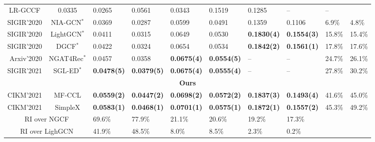 \documentclass[sigconf,authorversion]{acmart}
\begin{document}
\begin{table*}[!t]
\begin{tabular}{rcllllllll}
  \multicolumn{1}{c|}{LR-GCCF} &
  0.0335 &
  \multicolumn{1}{l|}{0.0265} &
  0.0561 &
  \multicolumn{1}{l|}{0.0343} &
  0.1519 &
  \multicolumn{1}{l|}{0.1285} &
  -- &
 -- \\
\multicolumn{1}{r|}{SIGIR'2020} &
  \multicolumn{1}{c|}{NIA-GCN$^\ast$} &
  0.0369 &
  \multicolumn{1}{l|}{0.0287} &
  0.0599 &
  \multicolumn{1}{l|}{0.0491} &
  0.1359 &
  \multicolumn{1}{l|}{0.1106} &
  6.9\% &
  4.8\% \\
\multicolumn{1}{r|}{SIGIR'2020} &
  \multicolumn{1}{c|}{LightGCN$^\ast$} &
  0.0411 &
  \multicolumn{1}{l|}{0.0315} &
  0.0649 &
  \multicolumn{1}{l|}{0.0530} &
  \textbf{0.1830(4)} &
  \multicolumn{1}{l|}{\textbf{0.1554(3)}} &
  15.8\% &
  15.4\% \\
\multicolumn{1}{r|}{SIGIR'2020} &
  \multicolumn{1}{c|}{DGCF$^\ast$} &
  0.0422 &
  \multicolumn{1}{l|}{0.0324} &
  0.0654 &
  \multicolumn{1}{l|}{0.0534} &
  \textbf{0.1842(2)} &
  \multicolumn{1}{l|}{\textbf{0.1561(1)}} &
  17.8\% &
  17.6\% \\
\multicolumn{1}{r|}{Arxiv'2020} &
  \multicolumn{1}{c|}{NGAT4Rec$^\ast$} &
  0.0457 &
  \multicolumn{1}{l|}{0.0358} &
  \textbf{0.0675(4)} &
  \multicolumn{1}{l|}{\textbf{0.0554(5)}} &
  -- &
  \multicolumn{1}{l|}{--} &
  24.7\% &
  26.1\% \\
\multicolumn{1}{r|}{SIGIR'2021} &
  \multicolumn{1}{c|}{SGL-ED$^\ast$} &
  \textbf{0.0478(5)} &
  \multicolumn{1}{l|}{\textbf{0.0379(5)}} &
  \textbf{0.0675(4)} &
  \multicolumn{1}{l|}{\textbf{0.0555(4)}} &
  -- &
  \multicolumn{1}{l|}{--} &
  27.8\% &
  30.2\% \\
 \hline
\multicolumn{10}{c}{\cellcolor[HTML]{F8F8F8}\textbf{Ours}} \\ \hline
\multicolumn{1}{r|}{CIKM'2021} &
  \multicolumn{1}{c|}{MF-CCL} &    
  \textbf{0.0559(2)} &
  \multicolumn{1}{l|}{\textbf{0.0447(2)}} &
  \textbf{0.0698(2)} &
  \multicolumn{1}{l|}{\textbf{0.0572(2)}} &
  \textbf{0.1837(3)} &
  \multicolumn{1}{l|}{\textbf{0.1493(4)}} &
  41.6\% &
  45.0\% \\
\multicolumn{1}{r|}{CIKM'2021} &  
  \multicolumn{1}{c|}{SimpleX} &
  \textbf{0.0583(1)} &
  \multicolumn{1}{l|}{\textbf{0.0468(1)}} &
  \textbf{0.0701(1)} &
  \multicolumn{1}{l|}{\textbf{0.0575(1)}} &
  \textbf{0.1872(1)} &
  \multicolumn{1}{l|}{\textbf{0.1557(2)}} &
  45.3\% &
  49.2\% \\ \hline
\multicolumn{2}{c|}{RI over NGCF} &
  69.6\% &
  \multicolumn{1}{l|}{77.9\%} &
  21.1\% &
  \multicolumn{1}{l|}{20.6\%} &
  19.2\% &
  \multicolumn{1}{l|}{17.3\%} &
   &
   \\
\multicolumn{2}{c|}{RI over LighGCN} &
  41.9\% &
  \multicolumn{1}{l|}{48.5\%} &
  8.0\% &
  \multicolumn{1}{l|}{8.5\%} &
  2.3\% &
  \multicolumn{1}{l|}{0.2\%} &
   &
   \\ \hline
\end{tabular}
\label{fullresults1}
\end{table*}
\end{document}
